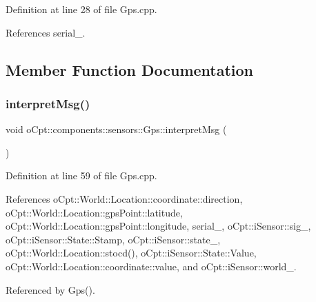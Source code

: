 Definition at line 28 of file Gps.\+cpp.



References serial\+\_\+.



\subsection{Member Function Documentation}
\hypertarget{classo_cpt_1_1components_1_1sensors_1_1_gps_a6effa9cffd5f203d84de1edce73be87a}{}\label{classo_cpt_1_1components_1_1sensors_1_1_gps_a6effa9cffd5f203d84de1edce73be87a} 
\subsubsection{\texorpdfstring{interpret\+Msg()}{interpretMsg()}}
{\footnotesize\ttfamily void o\+Cpt\+::components\+::sensors\+::\+Gps\+::interpret\+Msg (\begin{DoxyParamCaption}{ }\end{DoxyParamCaption})\hspace{0.3cm}{\ttfamily [protected]}}



Definition at line 59 of file Gps.\+cpp.



References o\+Cpt\+::\+World\+::\+Location\+::coordinate\+::direction, o\+Cpt\+::\+World\+::\+Location\+::gps\+Point\+::latitude, o\+Cpt\+::\+World\+::\+Location\+::gps\+Point\+::longitude, serial\+\_\+, o\+Cpt\+::i\+Sensor\+::sig\+\_\+, o\+Cpt\+::i\+Sensor\+::\+State\+::\+Stamp, o\+Cpt\+::i\+Sensor\+::state\+\_\+, o\+Cpt\+::\+World\+::\+Location\+::stocd(), o\+Cpt\+::i\+Sensor\+::\+State\+::\+Value, o\+Cpt\+::\+World\+::\+Location\+::coordinate\+::value, and o\+Cpt\+::i\+Sensor\+::world\+\_\+.



Referenced by Gps().

